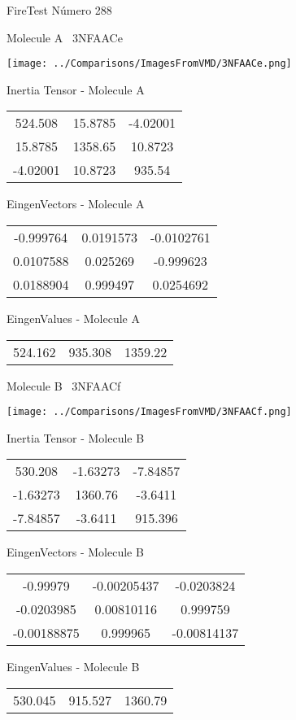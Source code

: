 \vtab[-3cm]
\begin{center}
{\large FireTest \tab Número 288}
\end{center}
\begin{multicols}{2}
\begin{center}

Molecule A \
3NFAACe

\texttt{[image: ../Comparisons/ImagesFromVMD/3NFAACe.png]}

Inertia Tensor - Molecule A \\
\begin{tabular}{|c c c|}
524.508	 & 	15.8785	 & 	-4.02001	 \\
15.8785	 & 	1358.65	 & 	10.8723	 \\
-4.02001	 & 	10.8723	 & 	935.54
\end{tabular}

\vtab
 EingenVectors - Molecule A     \\
\begin{tabular}{|c c c|}
-0.999764	 & 	0.0191573	 & 	-0.0102761	 \\
0.0107588	 & 	0.025269	 & 	-0.999623	 \\
0.0188904	 & 	0.999497	 & 	0.0254692
\end{tabular}

\vtab
 EingenValues - Molecule A     \\
\begin{tabular}{|c c c|}
524.162	 & 	935.308	 & 	1359.22	 \\
\end{tabular}
\columnbreak

Molecule B \
3NFAACf

\texttt{[image: ../Comparisons/ImagesFromVMD/3NFAACf.png]}

Inertia Tensor - Molecule B \\
\begin{tabular}{|c c c|}
530.208	 & 	-1.63273	 & 	-7.84857	 \\
-1.63273	 & 	1360.76	 & 	-3.6411	 \\
-7.84857	 & 	-3.6411	 & 	915.396
\end{tabular}

\vtab
 EingenVectors - Molecule B     \\
\begin{tabular}{|c c c|}
-0.99979	 & 	-0.00205437	 & 	-0.0203824	 \\
-0.0203985	 & 	0.00810116	 & 	0.999759	 \\
-0.00188875	 & 	0.999965	 & 	-0.00814137
\end{tabular}

\vtab
 EingenValues - Molecule B     \\
\begin{tabular}{|c c c|}
530.045	 & 	915.527	 & 	1360.79	 \\
\end{tabular}

\end{center}
\end{multicols}

